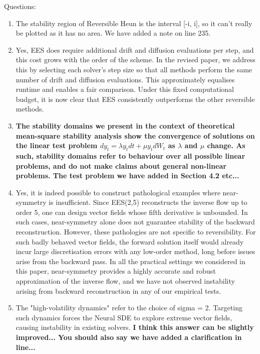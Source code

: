 \documentclass{article}
\newcommand{\TODO}[1]{\color{red}\textbf{{#1}}\color{black}}
\newcommand{\CRIS}[1]{\color{blue}\textbf{{#1}}\color{black}}
\newcommand{\NEW}[1]{\color{maroon}\textbf{{#1}}\color{black}}
\begin{document}
Questions:
\begin{enumerate}
    \item The stability region of Reversible Heun is the interval [-i, i], so it can't really be plotted as it has no area. We have added a note on line 235.
    \item Yes, EES does require additional drift and diffusion evaluations per step, and this cost grows with the order of the scheme. In the revised paper, we address this by selecting each solver’s step size so that all methods perform the same number of drift and diffusion evaluations. This approximately equalises runtime and enables a fair comparison. Under this fixed computational budget, it is now clear that EES consistently outperforms the other reversible methods.
    \item \NEW{The stability domains we present in the context of theoretical mean-square stability analysis show the convergence of solutions on the linear test problem $dy_t = \lambda y_t dt + \mu y_t dW_t$ as $\lambda$ and $\mu$ change. As such, stability domains refer to behaviour over all possible linear problems, and do not make claims about general non-linear problems. The test problem we have added in Section 4.2 \TODO{etc...}}
    \item Yes, it is indeed possible to construct pathological examples where near-symmetry is insufficient. Since EES(2,5) reconstructs the inverse flow up to order 5, one can design vector fields whose fifth derivative is unbounded. In such cases, near-symmetry alone does not guarantee stability of the backward reconstruction. However, these pathologies are not specific to reversibility. For such badly behaved vector fields, the forward solution itself would already incur large discretisation errors with any low-order method, long before issues arise from the backward pass. In all the practical settings we considered in this paper, near-symmetry provides a highly accurate and robust approximation of the inverse flow, and we have not observed instability arising from backward reconstruction in any of our empirical tests.
    \item The "high-volatility dynamics" refer to the choice of sigma = 2. Targeting such dynamics forces the Neural SDE to explore extreme vector fields, causing instability in existing solvers. \CRIS{I think this answer can be slightly improved... You should also say we have added a clarification in line...}
\end{enumerate}
\end{document}
